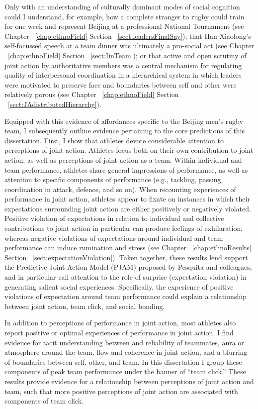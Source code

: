 Only with an understanding of culturally dominant modes of social cognition could I understand, for example, how a complete stranger to rugby could train for one week and represent Beijing at a professional National Tournament (see Chapter ~\ref{chap:ethnoField} Section ~\ref{sect:leadersFinalSay}); that Han Xiaolong's self-focussed speech at a team dinner was ultimately a pro-social act (see Chapter ~\ref{chap:ethnoField} Section ~\ref{sect:IinTeam}); or that active and open scrutiny of joint action by authoritative members was a central mechanism for regulating quality of interpersonal coordination in a hierarchical system in which leaders were motivated to preserve face and boundaries between self and other were relatively porous (see Chapter ~\ref{chap:ethnoField} Section ~\ref{sect:JAdistributedHierarchy}).

Equipped with this evidence of affordances specific to the Beijing men's rugby team, I subsequently outline evidence pertaining to the core predictions of this dissertation.  First, I show that athletes devote considerable attention to perceptions of joint action.  Athletes focus both on their own contribution to joint action, as well as perceptions of joint action as a team.  Within individual and team performance, athletes share general impressions of performance, as well as attention to specific components of performance (e.g., tackling, passing, coordination in attack, defence, and so on).  When recounting experiences of performance in joint action, athletes appear to fixate on instances in which their expectations surrounding joint action are either positively or negatively violated.  Positive violation of expectations in relation to individual and collective contributions to joint action in particular can produce feelings of exhilaration; whereas negative violations of expectations around individual and team performance can induce rumination and stress (see Chapter ~\ref{chap:ethnoResults} Section ~\ref{sect:expectationViolation}).  Taken together, these results lend support the Predictive Joint Action Model (PJAM) proposed by Pesquita and colleagues, and in particular call attention to the role of surprise (expectation violation) in generating salient social experiences. Specifically, the experience of positive violations of expectation around team performance could explain a relationship between joint action, team click, and social bonding.

In addition to perceptions of performance in joint action, most athletes also report positive or optimal experiences of performance in joint action.  I find evidence for tacit understanding between and reliability of teammates, aura or atmosphere around the team, flow and coherence in joint action, and a blurring of boundaries between self, other, and team.  In this dissertation I group these components of peak team performance under the banner of ``team click.''    These results provide evidence for a relationship between perceptions of joint action and team, such that more positive perceptions of joint action are associated with components of team click.

